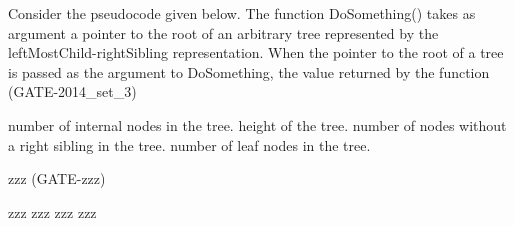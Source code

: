 \begin{questyle}
  \question  Consider the pseudocode given below. The function DoSomething() takes as argument a pointer
             to the root of an arbitrary tree represented by the leftMostChild-rightSibling representation. When
             the pointer to the root of a tree is passed as the argument to DoSomething, the value returned by
             the function (GATE-2014\_set\_3)
              
  \begin{choices}
    \choice         number of internal nodes in the tree.
    \choice         height of the tree.
    \choice         number of nodes without a right sibling in the tree.
    \CorrectChoice  number of leaf nodes in the tree.
  \end{choices}
\end{questyle}

\begin{questyle}
  \question  zzz  (GATE-zzz)

  \begin{choices}
    \choice         zzz
    \choice         zzz
    \choice         zzz
    \choice         zzz
    \CorrectChoice
  \end{choices}
\end{questyle}
